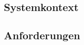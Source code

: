 
\subsection{Systemkontext}\label{subsec:systemkontext}


\subsection{Anforderungen}\label{subsec:anforderungen}


